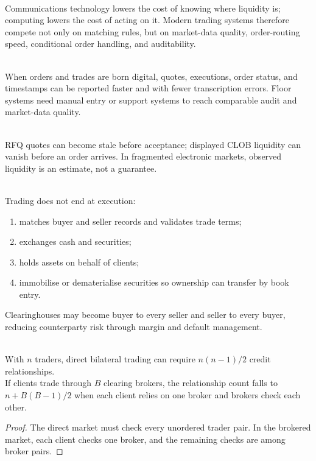 \begin{mechanism} \\
Communications technology lowers the cost of knowing where liquidity is; computing lowers the cost of acting on it. Modern trading systems therefore compete not only on matching rules, but on market-data quality, order-routing speed, conditional order handling, and auditability.
\end{mechanism}

\begin{mechanism} \\
When orders and trades are born digital, quotes, executions, order status, and timestamps can be reported faster and with fewer transcription errors. Floor systems need manual entry or support systems to reach comparable audit and market-data quality.
\end{mechanism}

\begin{caveat} \\
RFQ quotes can become stale before acceptance; displayed CLOB liquidity can vanish before an order arrives. In fragmented electronic markets, observed liquidity is an estimate, not a guarantee.
\end{caveat}

\begin{process} \\
Trading does not end at execution:
\begin{enumerate}[label=\roman*.]
\setlength{\itemsep}{0pt}
\item {} matches buyer and seller records and validates trade terms;
\item {} exchanges cash and securities;
\item {} holds assets on behalf of clients;
\item {} immobilise or dematerialise securities so ownership can transfer by book entry.
\end{enumerate}
Clearinghouses may become buyer to every seller and seller to every buyer, reducing counterparty risk through margin and default management.
\end{process}

\begin{proposition} \\
With $n$ traders, direct bilateral trading can require $n(n-1)/2$ credit relationships.\\
If clients trade through $B$ clearing brokers, the relationship count falls to $n+B(B-1)/2$ when each client relies on one broker and brokers check each other.
\begin{proof}
The direct market must check every unordered trader pair. In the brokered market, each client checks one broker, and the remaining checks are among broker pairs.
\end{proof}
\end{proposition}

